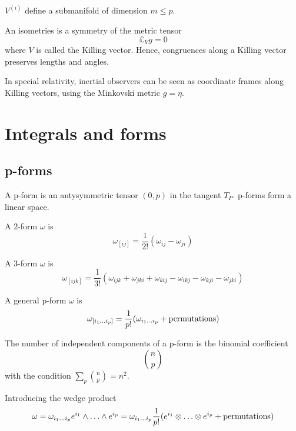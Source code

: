     \begin{corollary}
        $V^{(i)}$ define a submanifold of dimension $m \leq p$.
    \end{corollary}

    An isometries is a symmetry of the metric tensor 
    \begin{equation*}
        \pounds_V g = 0
    \end{equation*}
    where $V$ is called the Killing vector. Hence, congruences along a Killing vector preserves lengths and angles.

    In special relativity, inertial observers can be seen as coordinate frames along Killing vectors, using the Minkovski metric $g = \eta$.

\chapter{Integrals and forms}

\section{p-forms}

    A p-form is an antysymmetric tensor $(0, p)$ in the tangent $T_P$. p-forms form a linear space. 

    A 2-form $\omega$ is 
    \begin{equation*}
        \omega_{[ij]} = \frac{1}{2!} (\omega_{ij} - \omega_{ji})
    \end{equation*}

    A 3-form $\omega$ is 
    \begin{equation*}
        \omega_{[ijk]} = \frac{1}{3!} (\omega_{ijk} + \omega_{jki} + \omega_{kij} - \omega_{ikj} - \omega_{kji} - \omega_{jki})
    \end{equation*}

    A general p-form $\omega$ is 
    \begin{equation*}
        \omega_{[i_1 \ldots i_p]} = \frac{1}{p!} (\omega_{i_1 \ldots i_p} + \textnormal{permutations})
    \end{equation*}

    The number of independent components of a p-form is the binomial coefficient 
    \begin{equation*}
        \binom{n}{p} 
    \end{equation*} 
    with the condition $\sum_p \binom{n}{p} = n^2$.

    Introducing the wedge product 
    \begin{equation*}
        \omega = \omega_{i_1 \ldots i_p} e^{i_1} \wedge \ldots \wedge e^{i_p} = \omega_{i_1 \ldots i_p} \frac{1}{p!} (e^{i_1} \otimes \ldots \otimes e^{i_p} + \textnormal{permutations})
    \end{equation*}

